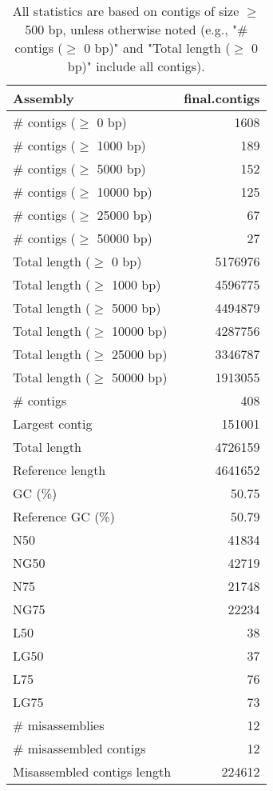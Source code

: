 \documentclass[12pt,a4paper]{article}
\begin{document}
\begin{table}[ht]
\begin{center}
\caption{All statistics are based on contigs of size $\geq$ 500 bp, unless otherwise noted (e.g., "\# contigs ($\geq$ 0 bp)" and "Total length ($\geq$ 0 bp)" include all contigs).}
\begin{tabular}{|l*{1}{|r}|}
\hline
Assembly & final.contigs \\ \hline
\# contigs ($\geq$ 0 bp) & 1608 \\ \hline
\# contigs ($\geq$ 1000 bp) & 189 \\ \hline
\# contigs ($\geq$ 5000 bp) & 152 \\ \hline
\# contigs ($\geq$ 10000 bp) & 125 \\ \hline
\# contigs ($\geq$ 25000 bp) & 67 \\ \hline
\# contigs ($\geq$ 50000 bp) & 27 \\ \hline
Total length ($\geq$ 0 bp) & 5176976 \\ \hline
Total length ($\geq$ 1000 bp) & 4596775 \\ \hline
Total length ($\geq$ 5000 bp) & 4494879 \\ \hline
Total length ($\geq$ 10000 bp) & 4287756 \\ \hline
Total length ($\geq$ 25000 bp) & 3346787 \\ \hline
Total length ($\geq$ 50000 bp) & 1913055 \\ \hline
\# contigs & 408 \\ \hline
Largest contig & 151001 \\ \hline
Total length & 4726159 \\ \hline
Reference length & 4641652 \\ \hline
GC (\%) & 50.75 \\ \hline
Reference GC (\%) & 50.79 \\ \hline
N50 & 41834 \\ \hline
NG50 & 42719 \\ \hline
N75 & 21748 \\ \hline
NG75 & 22234 \\ \hline
L50 & 38 \\ \hline
LG50 & 37 \\ \hline
L75 & 76 \\ \hline
LG75 & 73 \\ \hline
\# misassemblies & 12 \\ \hline
\# misassembled contigs & 12 \\ \hline
Misassembled contigs length & 224612 \\ \hline

\end{tabular}
\end{center}
\end{table}
\end{document}
